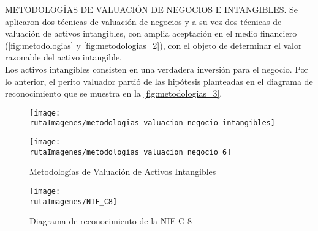 \begin{rightcolumn}

\textcolor{secundario}{METODOLOG\'IAS DE VALUACI\'ON DE NEGOCIOS E INTANGIBLES}. Se aplicaron \textcolor{secundario}{dos t\'ecnicas de valuaci\'on de negocios} y a su vez dos t\'ecnicas de valuaci\'on de activos intangibles, con amplia aceptaci\'on en el medio financiero (\autoref{fig:metodologias} y \autoref{fig:metodologias_2}), con el objeto de determinar el \textcolor{secundario}{valor razonable del activo intangible}.\\

Los activos intangibles consisten en una verdadera inversi\'on para el negocio. Por lo anterior, el perito valuador parti\'o de las hip\'otesis planteadas en el  diagrama de reconocimiento que se muestra en la \autoref{fig:metodologias_3}.
\end{rightcolumn}


\begin{leftcolumn}

\begin{figure}[H]
\centering
\caption{Metodolog\'ias de Valuaci\'on de negocios\label{fig:metodologias}}
\texttt{[image: \\rutaImagenes/metodologias\_valuacion\_negocio\_intangibles]}\\

\caption{Metodolog\'ias de Valuaci\'on de Activos Intangibles\label{fig:metodologias_2}}
\texttt{[image: \\rutaImagenes/metodologias\_valuacion\_negocio\_6]}\\

\end{figure}


\begin{figure}[H]
\centering
\caption{Diagrama de reconocimiento de la NIF C-8\label{fig:metodologias_3}}
\texttt{[image: \\rutaImagenes/NIF\_C8]}\\
\end{figure}

\end{leftcolumn}

